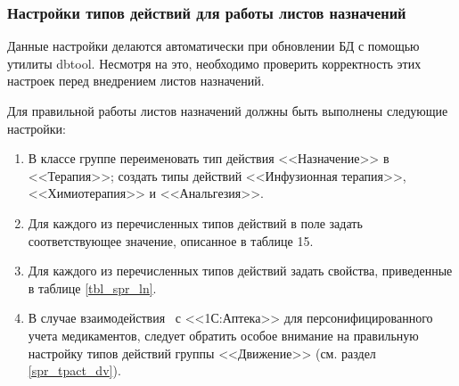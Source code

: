 \subsubsection{Настройки типов действий для работы листов назначений} 

\begin{vnim}
Данные настройки делаются автоматически при обновлении БД с помощью утилиты dbtool. Несмотря на это, необходимо проверить корректность этих настроек перед внедрением листов назначений.
\end{vnim}

Для правильной работы листов назначений должны быть выполнены следующие настройки:
\begin{enumerate}
 \item В классе  группе  переименовать тип действия <<Назначение>> в <<Терапия>>; создать типы действий <<Инфузионная терапия>>, <<Химиотерапия>> и <<Анальгезия>>.
 \item Для каждого из перечисленных типов действий в поле  задать соответствующее значение, описанное в таблице 15.
 \item Для каждого из перечисленных типов действий задать свойства, приведенные в таблице \ref{tbl_spr_ln}.
 \item В случае взаимодействия \tmis~с <<1С:Аптека>> для персонифицированного учета медикаментов, следует обратить особое внимание на правильную настройку типов действий группы <<Движение>> (см. раздел \ref{spr_tpact_dv}).
\end{enumerate}

